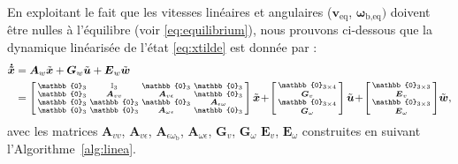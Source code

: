 En exploitant le fait que les vitesses linéaires et angulaires ($\boldsymbol{v}_{\text{eq}}$, $\boldsymbol{\omega}_{\text{b,eq}})$ doivent être nulles à l'équilibre (voir \eqref{eq:equilibrium}), nous prouvons ci-dessous que la dynamique linéarisée de l'état \eqref{eq:xtilde} est donnée par : 
\begin{align}
\label{eq:lpv_linearisation}
 \boldsymbol{\dot{\tilde{x}}} &= \boldsymbol{A}_{w} \tilde{\boldsymbol{x}} + \boldsymbol{G}_{w} \tilde{\boldsymbol{u}} + \boldsymbol{E}_{w}  \tilde{\boldsymbol{w}} \\
 &= \smallmat{
     \mathbb{0}_{3} & \mathbb{I}_{3} & \mathbb{0}_{3} &\mathbb{0}_{3} \\
    \mathbb{0}_{3} & \boldsymbol{A}_{vv}  & \boldsymbol{A}_{v\epsilon}  & \mathbb{0}_{3}\\
    \mathbb{0}_{3} & \mathbb{0}_{3} & \mathbb{0}_{3} & \boldsymbol{A}_{\epsilon \omega} \\    
    \mathbb{0}_{3} & \mathbb{0}_{3} &  \boldsymbol{A}_{\omega \epsilon} & \mathbb{0}_{3}
    } \tilde{\boldsymbol{x}} \!+\!
    \smallmat{ \mathbb{0}_{3 \times 4} \\
     \boldsymbol{G}_{v}\\
     \mathbb{0}_{3 \times 4}\\
     \boldsymbol{G}_{\omega}
    } \tilde{\boldsymbol{u}}
    \!+\! \smallmat{
     \mathbb{0}_{3 \times 3} \\
     \boldsymbol{E}_{v} \\
     \mathbb{0}_{3 \times 3} \\
     \boldsymbol{E}_{\omega} 
     } \!\tilde{\boldsymbol{w}},
     \nonumber
\end{align}
%
avec les matrices $\boldsymbol{A}_{vv} $, $\boldsymbol{A}_{v\epsilon}$, $\boldsymbol{A}_{\epsilon \omega_{\text{b}}}$, $\boldsymbol{A}_{\omega \epsilon}$, $ \boldsymbol{G}_{v}$, $\boldsymbol{G}_{\omega}$ $\boldsymbol{E}_{v}$, $\boldsymbol{E}_{\omega}$ construites en suivant l'Algorithme~\ref{alg:linea}.


